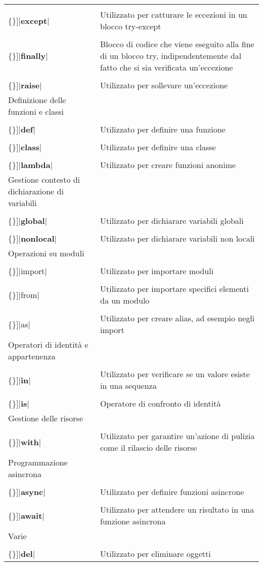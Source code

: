 \documentclass[
  letterpaper,
  DIV=11,
  numbers=noendperiod]{scrreprt}
\newcommand{\VERB}{\Verb[commandchars=\\\{\}]}
\newcommand{\ControlFlowTok}[1]{\textcolor[rgb]{0.00,0.23,0.31}{\textbf{#1}}}
\newcommand{\ImportTok}[1]{\textcolor[rgb]{0.00,0.46,0.62}{#1}}
\newcommand{\KeywordTok}[1]{\textcolor[rgb]{0.00,0.23,0.31}{\textbf{#1}}}
\begin{document}
\begin{longtable}[]{@{}
  >{\raggedright\arraybackslash}p{}
  >{\raggedright\arraybackslash}p{}@{}}
\VERB|\ControlFlowTok{except}| & Utilizzato per catturare le eccezioni
in un blocco try-except \\
\VERB|\ControlFlowTok{finally}| & Blocco di codice che viene eseguito
alla fine di un blocco try, indipendentemente dal fatto che si sia
verificata un'eccezione \\
\VERB|\ControlFlowTok{raise}| & Utilizzato per sollevare un'eccezione \\
Definizione delle funzioni e classi & \\
\VERB|\KeywordTok{def}| & Utilizzato per definire una funzione \\
\VERB|\KeywordTok{class}| & Utilizzato per definire una classe \\
\VERB|\KeywordTok{lambda}| & Utilizzato per creare funzioni anonime \\
Gestione contesto di dichiarazione di variabili & \\
\VERB|\KeywordTok{global}| & Utilizzato per dichiarare variabili
globali \\
\VERB|\KeywordTok{nonlocal}| & Utilizzato per dichiarare variabili non
locali \\
Operazioni su moduli & \\
\VERB|\ImportTok{import}| & Utilizzato per importare moduli \\
\VERB|\ImportTok{from}| & Utilizzato per importare specifici elementi da
un modulo \\
\VERB|\ImportTok{as}| & Utilizzato per creare alias, ad esempio negli
import \\
Operatori di identità e appartenenza & \\
\VERB|\KeywordTok{in}| & Utilizzato per verificare se un valore esiste
in una sequenza \\
\VERB|\KeywordTok{is}| & Operatore di confronto di identità \\
Gestione delle risorse & \\
\VERB|\ControlFlowTok{with}| & Utilizzato per garantire un'azione di
pulizia come il rilascio delle risorse \\
Programmazione asincrona & \\
\VERB|\ControlFlowTok{async}| & Utilizzato per definire funzioni
asincrone \\
\VERB|\ControlFlowTok{await}| & Utilizzato per attendere un risultato in
una funzione asincrona \\
Varie & \\
\VERB|\KeywordTok{del}| & Utilizzato per eliminare oggetti \\

\end{longtable}
\end{document}
